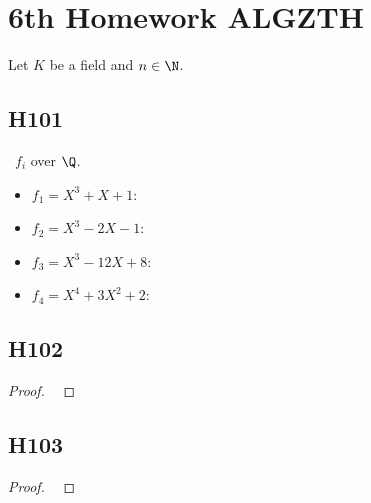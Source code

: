 
\section{6th Homework ALGZTH}
Let $K$ be a field and $n \in \N$.
\subsection{H101}
\begin{solution}\
	$f_i$ over $\Q$.
	\begin{itemize}
		\item $f_1 = X^3 + X + 1$:
		\item $f_2 = X^3 - 2X - 1$:
		\item $f_3 = X^3 - 12X + 8$:
		\item $f_4 = X^4 + 3X^2 + 2$:
		\end{itemize}
\end{solution}

\subsection{H102}
\begin{proof}\
	
\end{proof}

\subsection{H103}
\begin{proof}\
	
\end{proof}